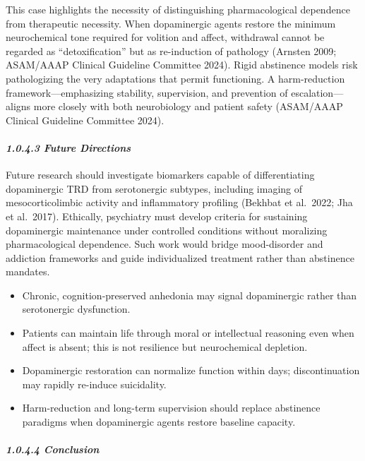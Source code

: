 This case highlights the necessity of distinguishing pharmacological dependence from therapeutic necessity. When dopaminergic agents restore the minimum neurochemical tone required for volition and affect, withdrawal cannot be regarded as ``detoxification'' but as re-induction of pathology (Arnsten 2009; ASAM/AAAP Clinical Guideline Committee 2024). Rigid abstinence models risk pathologizing the very adaptations that permit functioning. A harm-reduction framework---emphasizing stability, supervision, and prevention of escalation---aligns more closely with both neurobiology and patient safety (ASAM/AAAP Clinical Guideline Committee 2024).

\paragraph{\texorpdfstring{\emph{1.0.4.3 Future Directions}}{1.0.4.3 Future Directions}}\label{10b_traad-future-directions}

Future research should investigate biomarkers capable of differentiating dopaminergic TRD from serotonergic subtypes, including imaging of mesocorticolimbic activity and inflammatory profiling (Bekhbat et al.~2022; Jha et al.~2017). Ethically, psychiatry must develop criteria for sustaining dopaminergic maintenance under controlled conditions without moralizing pharmacological dependence. Such work would bridge mood-disorder and addiction frameworks and guide individualized treatment rather than abstinence mandates.

\begin{itemize}
\item
  Chronic, cognition-preserved anhedonia may signal dopaminergic rather than serotonergic dysfunction.
\item
  Patients can maintain life through moral or intellectual reasoning even when affect is absent; this is not resilience but neurochemical depletion.
\item
  Dopaminergic restoration can normalize function within days; discontinuation may rapidly re-induce suicidality.
\item
  Harm-reduction and long-term supervision should replace abstinence paradigms when dopaminergic agents restore baseline capacity.
\end{itemize}

\paragraph{\texorpdfstring{\emph{1.0.4.4 Conclusion}}{1.0.4.4 Conclusion}}\label{10b_traad-conclusion}

